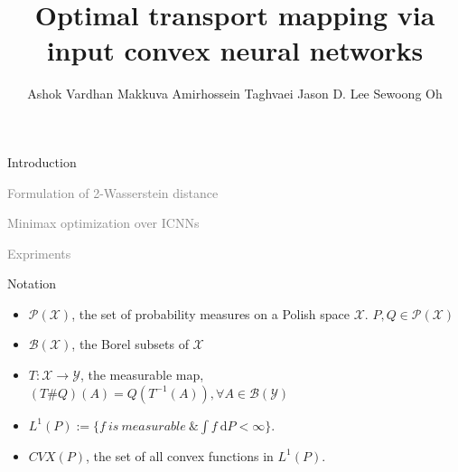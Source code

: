 \documentclass{beamer}		%
\title[Optimal transport mapping via input convex neural networks]{Optimal transport mapping via input convex neural networks}	%
\author[Shen Yuan]{Ashok Vardhan Makkuva \quad Amirhossein Taghvaei \quad  Jason D. Lee  \quad Sewoong Oh} %
\newcommand{\dd}{\mathrm{d}}
\begin{document}


\newcommand{\light}[1]{\textcolor{gray}{#1}}

\begin{frame}	

\titlepage	%
	
\end{frame}	




\begin{frame}[noframenumbering]

\begin{itemize}

    \begin{LARGE}
    
    \item Introduction
    
    \item \light{Formulation of 2-Wasserstein distance}
    
    \item \light{Minimax optimization over ICNNs}
    
    \item \light{Expriments}

    \end{LARGE}
    
\end{itemize}
	
\end{frame}









\begin{frame}{Notation}
    \begin{itemize}
        \item $\mathcal{P(X)}$, the set of probability measures
        on a Polish space $\mathcal{X}$. $P,Q\in\mathcal{P(X)}$
        \item $\mathcal{B(X)}$, the Borel subsets of $\mathcal{X}$
        \item $T:\mathcal{X} \to \mathcal{Y}$, the measurable map, $(T\#Q)(A)=Q(T^{-1}(A)), \forall A\in \mathcal{B(Y)}$
        \item $L^1(P):=\{f\ is\ measurable\ \& \int f\ \dd P < \infty \}$.
        \item $CVX(P)$, the set of all convex functions in $L^1(P)$.
    \end{itemize}    
\end{frame}
\end{document}
